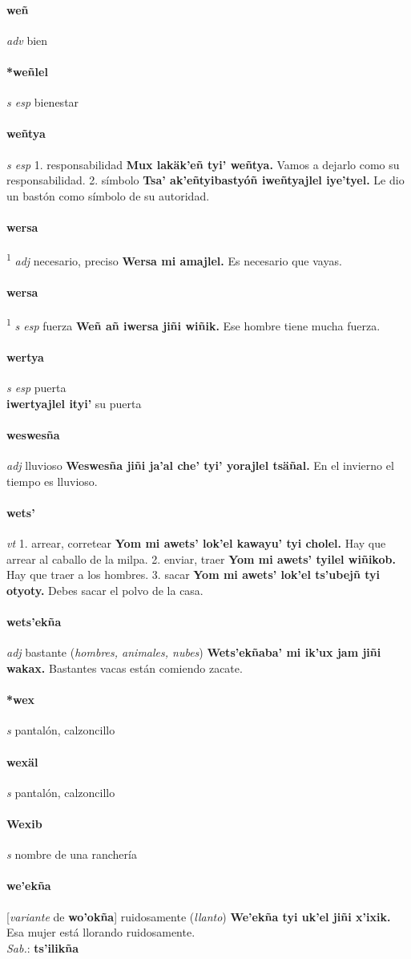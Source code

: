 \documentclass{scrbook}
\newcommand{\entry}[1]{\paragraph{#1}}
\newcommand{\onedefinition}[1]{#1.}
\newcommand{\defsuperscript}[1]{\textsuperscript{1}}
\newcommand{\partofspeech}[1]{\textit{#1}}
\newcommand{\spanishtranslation}[1]{#1}
\newcommand{\clarification}[1]{(\textit{#1})}
\newcommand{\cholexample}[1]{\textbf{#1}}
\newcommand{\exampletranslation}[1]{#1}
\newcommand{\dialectvariant}[1]{\\\textit{#1}:}
\newcommand{\dialectword}[1]{\textbf{#1}}
\newcommand{\secondaryentry}[1]{\\\textbf{#1}}
\newcommand{\secondtranslation}[1]{#1}
\newcommand{\conjugationtense}[1]{[\textit{#1}}
\newcommand{\conjugationverb}[1]{de \textbf{#1}]}
\begin{document}
\begin{multicols}{2}
\entry{weñ}
\partofspeech{adv}
\spanishtranslation{bien}

\entry{*weñlel}
\partofspeech{s esp}
\spanishtranslation{bienestar}

\entry{weñtya}
\partofspeech{s esp}
\onedefinition{1}
\spanishtranslation{responsabilidad}
\cholexample{Mux lakäk'eñ tyi' weñtya.}
\exampletranslation{Vamos a dejarlo como su responsabilidad.}
\onedefinition{2}
\spanishtranslation{símbolo}
\cholexample{Tsa' ak'eñtyibastyóñ iweñtyajlel iye'tyel.}
\exampletranslation{Le dio un bastón como símbolo de su autoridad.}

\entry{wersa}
\defsuperscript{2}
\partofspeech{adj}
\spanishtranslation{necesario, preciso}
\cholexample{Wersa mi amajlel.}
\exampletranslation{Es necesario que vayas.}

\entry{wersa}
\defsuperscript{1}
\partofspeech{s esp}
\spanishtranslation{fuerza}
\cholexample{Weñ añ iwersa jiñi wiñik.}
\exampletranslation{Ese hombre tiene mucha fuerza.}

\entry{wertya}
\partofspeech{s esp}
\spanishtranslation{puerta}
\secondaryentry{iwertyajlel ityi'}
\secondtranslation{su puerta}

\entry{weswesña}
\partofspeech{adj}
\spanishtranslation{lluvioso}
\cholexample{Weswesña jiñi ja'al che' tyi' yorajlel tsäñal.}
\exampletranslation{En el invierno el tiempo es lluvioso.}

\entry{wets'}
\partofspeech{vt}
\onedefinition{1}
\spanishtranslation{arrear, corretear}
\cholexample{Yom mi awets' lok'el kawayu' tyi cholel.}
\exampletranslation{Hay que arrear al caballo de la milpa.}
\onedefinition{2}
\spanishtranslation{enviar, traer}
\cholexample{Yom mi awets' tyilel wiñikob.}
\exampletranslation{Hay que traer a los hombres.}
\onedefinition{3}
\spanishtranslation{sacar}
\cholexample{Yom mi awets' lok'el ts'ubejñ tyi otyoty.}
\exampletranslation{Debes sacar el polvo de la casa.}

\entry{wets'ekña}
\partofspeech{adj}
\spanishtranslation{bastante}
\clarification{hombres, animales, nubes}
\cholexample{Wets'ekñaba' mi ik'ux jam jiñi wakax.}
\exampletranslation{Bastantes vacas están comiendo zacate.}

\entry{*wex}
\partofspeech{s}
\spanishtranslation{pantalón, calzoncillo}

\entry{wexäl}
\partofspeech{s}
\spanishtranslation{pantalón, calzoncillo}

\entry{Wexib}
\partofspeech{s}
\spanishtranslation{nombre de una ranchería}

\entry{we'ekña}
\conjugationtense{variante}
\conjugationverb{wo'okña}
\spanishtranslation{ruidosamente}
\clarification{llanto}
\cholexample{We'ekña tyi uk'el jiñi x'ixik.}
\exampletranslation{Esa mujer está llorando ruidosamente.}
\dialectvariant{Sab.}
\dialectword{ts'ilikña}


\end{multicols}
\end{document}
